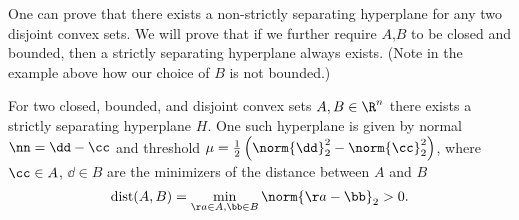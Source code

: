 One can prove that there exists a non-strictly separating hyperplane for any two disjoint convex sets.
We will prove that if we further require $A$,$B$ to be closed and
bounded, then a strictly separating hyperplane always exists. (Note in
the example above how our choice of $B$ is not bounded.)

\begin{theorem} \label{th:shtcb}
For two closed, bounded, and disjoint convex sets $A, B \in \R^n$ there exists a strictly separating hyperplane $H$.
One such hyperplane is given by normal $\nn = \dd - \cc$ and threshold $\mu = \frac{1}{2}\left(\norm{\dd}_2^2 - \norm{\cc}_2^2\right)$, where $\cc \in A$, $\dd \in B$ are the minimizers of the distance between $A$ and $B$
\begin{equation*} \text{dist}(A, B) = \min_{\aa\in A, \bb \in B}\norm{\aa-\bb}_2 > 0.\end{equation*}
\end{theorem}
